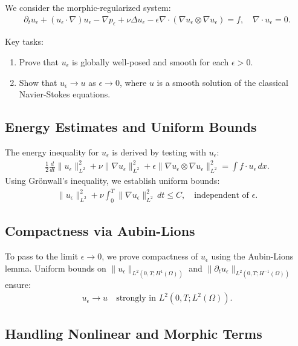 \documentclass[12pt]{article}
\begin{document}
We consider the morphic-regularized system:
\begin{align}
\partial_t u_\epsilon + (u_\epsilon \cdot \nabla) u_\epsilon - \nabla p_\epsilon + \nu \Delta u_\epsilon - \epsilon \nabla \cdot (\nabla u_\epsilon \otimes \nabla u_\epsilon) = f, \quad \nabla \cdot u_\epsilon = 0.
\end{align}

Key tasks:
\begin{enumerate}
    \item Prove that $u_\epsilon$ is globally well-posed and smooth for each $\epsilon > 0$.
    \item Show that $u_\epsilon \to u$ as $\epsilon \to 0$, where $u$ is a smooth solution of the classical Navier-Stokes equations.
\end{enumerate}

\subsection{Energy Estimates and Uniform Bounds}

The energy inequality for $u_\epsilon$ is derived by testing with $u_\epsilon$:
\begin{align}
\frac{1}{2} \frac{d}{dt} \| u_\epsilon \|_{L^2}^2 + \nu \| \nabla u_\epsilon \|_{L^2}^2 + \epsilon \| \nabla u_\epsilon \otimes \nabla u_\epsilon \|_{L^2}^2 = \int f \cdot u_\epsilon \, dx.
\end{align}
Using Gr\"onwall's inequality, we establish uniform bounds:
\begin{align}
\| u_\epsilon \|_{L^2}^2 + \nu \int_0^T \| \nabla u_\epsilon \|_{L^2}^2 \, dt \leq C, \quad \text{independent of } \epsilon.
\end{align}

\subsection{Compactness via Aubin-Lions}

To pass to the limit $\epsilon \to 0$, we prove compactness of $u_\epsilon$ using the Aubin-Lions lemma. Uniform bounds on $\| u_\epsilon \|_{L^2(0,T; H^1(\Omega))}$ and $\| \partial_t u_\epsilon \|_{L^2(0,T; H^{-1}(\Omega))}$ ensure:
\begin{align}
    u_\epsilon \to u \quad \text{strongly in } L^2(0, T; L^2(\Omega)).
\end{align}

\subsection{Handling Nonlinear and Morphic Terms}
\end{document}
